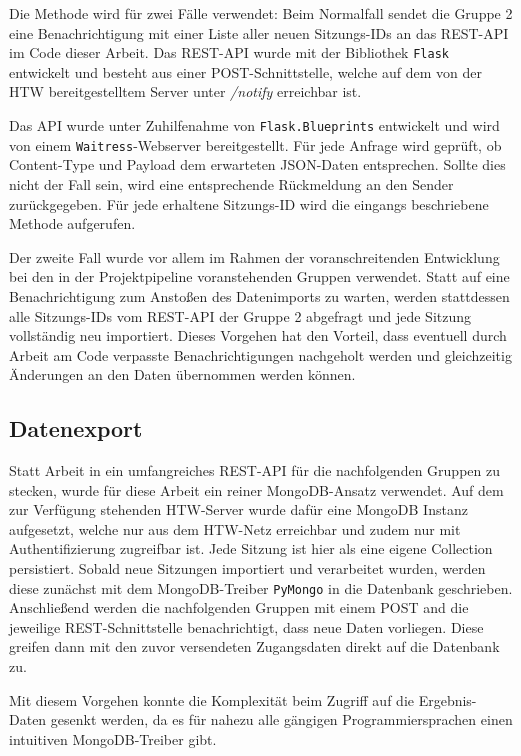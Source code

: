 Die Methode wird für zwei Fälle verwendet: 
Beim Normalfall sendet die Gruppe 2 eine Benachrichtigung mit einer Liste aller neuen Sitzungs-IDs an das REST-API im Code dieser Arbeit. 
Das REST-API wurde mit der Bibliothek \texttt{Flask} \cite{g3_flask} entwickelt und besteht aus einer POST-Schnittstelle, welche auf dem von der HTW bereitgestelltem Server unter \textit{/notify} erreichbar ist. 

Das API wurde unter Zuhilfenahme von \texttt{Flask.Blueprints} \cite{g3_flaskbp} entwickelt und wird von einem \texttt{Waitress}-Webserver \cite{g3_waitress} bereitgestellt. 
Für jede Anfrage wird geprüft, ob Content-Type und Payload dem erwarteten JSON-Daten entsprechen. 
Sollte dies nicht der Fall sein, wird eine entsprechende Rückmeldung an den Sender zurückgegeben. 
Für jede erhaltene Sitzungs-ID wird die eingangs beschriebene Methode aufgerufen. 

Der zweite Fall wurde vor allem im Rahmen der voranschreitenden Entwicklung bei den in der Projektpipeline voranstehenden Gruppen verwendet. 
Statt auf eine Benachrichtigung zum Anstoßen des Datenimports zu warten, werden stattdessen alle Sitzungs-IDs vom REST-API der Gruppe 2 abgefragt und jede Sitzung vollständig neu importiert. 
Dieses Vorgehen hat den Vorteil, dass eventuell durch Arbeit am Code verpasste Benachrichtigungen nachgeholt werden und gleichzeitig Änderungen an den Daten übernommen werden können. 

\subsection{Datenexport}
\label{g3export}
Statt Arbeit in ein umfangreiches REST-API für die nachfolgenden Gruppen zu stecken, wurde für diese Arbeit ein reiner MongoDB-Ansatz verwendet. 
Auf dem zur Verfügung stehenden HTW-Server wurde dafür eine MongoDB Instanz aufgesetzt, welche nur aus dem HTW-Netz erreichbar und zudem nur mit Authentifizierung zugreifbar ist. 
Jede Sitzung ist hier als eine eigene Collection persistiert. 
Sobald neue Sitzungen importiert und verarbeitet wurden, werden diese zunächst mit dem MongoDB-Treiber \texttt{PyMongo} \cite{g3_mongodb} in die Datenbank geschrieben. 
Anschließend werden die nachfolgenden Gruppen mit einem POST and die jeweilige REST-Schnittstelle benachrichtigt, dass neue Daten vorliegen. 
Diese greifen dann mit den zuvor versendeten Zugangsdaten direkt auf die Datenbank zu. 

Mit diesem Vorgehen konnte die Komplexität beim Zugriff auf die Ergebnis-Daten gesenkt werden, da es für nahezu alle gängigen Programmiersprachen einen intuitiven MongoDB-Treiber gibt. 

